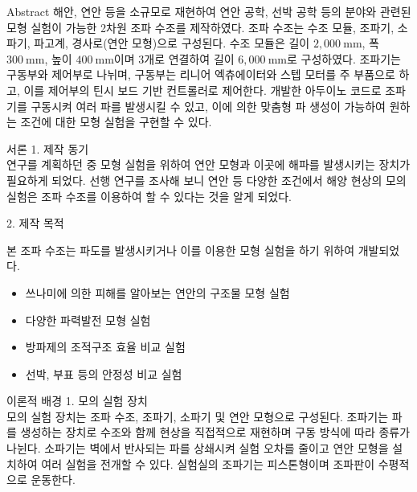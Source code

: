 \documentclass[a0paper,portrait]{baposter}
\begin{document}
\begin{poster}

\begin{posterbox}[name=abstra,column=0,row=0]{Abstract}
  \scriptsize{
  해안, 연안 등을 소규모로 재현하여 연안 공학, 선박 공학 등의 분야와 관련된 모형 실험이 가능한 2차원 조파 수조를 제작하였다. 조파 수조는 수조 모듈, 조파기, 소파기, 파고계, 경사로(연안 모형)으로 구성된다. 수조 모듈은 길이 $2,000~\mathrm{mm}$, 폭 $300~\mathrm{mm}$, 높이 $400~\mathrm{mm}$이며 3개로 연결하여 길이 $6,000~\mathrm{mm}$로 구성하였다. 조파기는 구동부와 제어부로 나뉘며, 구동부는 리니어 엑츄에이터와 스텝 모터를 주 부품으로 하고, 이를 제어부의 틴시 보드 기반 컨트롤러로 제어한다. 개발한 아두이노 코드로 조파기를 구동시켜 여러 파를 발생시킬 수 있고, 이에 의한 맞춤형 파 생성이 가능하여 원하는 조건에 대한 모형 실험을 구현할 수 있다.
  }
\end{posterbox}

\begin{posterbox}[name=intro,column=0,below=abstra]{서론}
    \small {1. 제작 동기 \\}
        \scriptsize {연구를 계획하던 중 모형 실험을 위하여 연안 모형과 이곳에 해파를 발생시키는 장치가 필요하게 되었다. 선행 연구를 조사해 보니 연안 등 다양한 조건에서 해양 현상의 모의 실험은 조파 수조를 이용하여 할 수 있다는 것을 알게 되었다\cite{chung2013}.\\}

    \small {2. 제작 목적} \\
        \scriptsize {본 조파 수조는 파도를 발생시키거나 이를 이용한 모형 실험을 하기 위하여 개발되었다. 
          \begin{itemize}
            \item 쓰나미에 의한 피해를 알아보는 연안의 구조물 모형 실험
            \item 다양한 파력발전 모형 실험
            \item 방파제의 조적구조 효율 비교 실험
            \item 선박, 부표 등의 안정성 비교 실험
          \end{itemize}
          }
        \end{posterbox}

\begin{posterbox}[name=theo,column=0,below=intro]{이론적 배경}
   \small {1. 모의 실험 장치\\} %
     \scriptsize {모의 실험 장치는 조파 수조, 조파기, 소파기 및 연안 모형으로 구성된다. 조파기는 파를 생성하는 장치로 수조와 함께 현상을 직접적으로 재현하며 구동 방식에 따라 종류가 나뉜다. 소파기는 벽에서 반사되는 파를 상쇄시켜 실험 오차를 줄이고 연안 모형을 설치하여 여러 실험을 전개할 수 있다. 실험실의 조파기는 피스톤형이며 조파판이 수평적으로 운동한다.\\}
     

\end{posterbox}
\end{poster}
\end{document}
